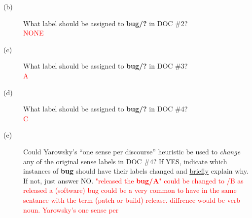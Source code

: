 \documentclass[11pt]{article}
\begin{document}
\begin{enumerate}
\begin{description}
\item[(b)] What label should be assigned to {\bf bug/?} in DOC \#2?  \\
\textcolor{red}{NONE} 

\item[(c)] What label should be assigned to {\bf bug/?} in DOC \#3?  \\
\textcolor{red}{A} 

\item[(d)] What label should be assigned to {\bf bug/?} in DOC \#4?  \\
\textcolor{red}{C}


\item[(e)] Could Yarowsky's ``one sense per discourse'' heuristic be used to
{\it change} any of the original sense labels in DOC \#4? If YES, indicate which
instances of {\bf bug} should have their labels changed  and
\underline{briefly} explain why.   If not, just answer NO.
\textcolor{red}{"released the {\bf bug/A}" could be changed to /B as released a (software) bug could be a very common to have in the same sentance with the term (patch or build) release. diffrence would be verb noun. Yarowsky's one sense per }

\end{description}




\end{enumerate}
\end{document}

